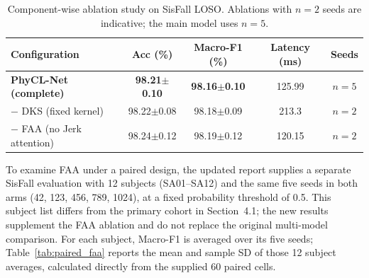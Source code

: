 \documentclass[jec]{acnsart}
\begin{document}
\begin{table}[htbp]
\caption{Ablation summary under SisFall LOSO. Seed counts refer to classification results; the ROC column uses the common constraints and two-seed aggregation.}
\label{tab:ablation}
\centering
\small
\setlength{\tabcolsep}{3pt}
\end{table}

\begin{table}[htbp]
\caption{Component-wise ablation study on SisFall LOSO. Ablations with $n{=}2$ seeds are indicative; the main model uses $n{=}5$.}
\label{tab:detailed_ablation}
\centering
\small
\begin{tabular}{lcccc}
\toprule
Configuration & Acc (\%) & Macro-F1 (\%) & Latency (ms) & Seeds \\
\midrule
\textbf{PhyCL-Net (complete)} & \textbf{98.21$\pm$0.10} & \textbf{98.16$\pm$0.10} & 125.99 & $n{=}5$ \\
\midrule
$-$ DKS (fixed kernel) & 98.22$\pm$0.08 & 98.18$\pm$0.09 & 213.3 & $n{=}2$ \\
$-$ FAA (no Jerk attention) & 98.24$\pm$0.12 & 98.19$\pm$0.12 & 120.15 & $n{=}2$ \\
\bottomrule
\end{tabular}
\end{table}

To examine FAA under a paired design, the updated report supplies a separate SisFall evaluation with 12 subjects (SA01--SA12) and the same five seeds in both arms (42, 123, 456, 789, 1024), at a fixed probability threshold of 0.5. This subject list differs from the primary cohort in Section~4.1; the new results supplement the FAA ablation and do not replace the original multi-model comparison. For each subject, Macro-F1 is averaged over its five seeds; Table~\ref{tab:paired_faa} reports the mean and sample SD of those 12 subject averages, calculated directly from the supplied 60 paired cells.
\end{document}
